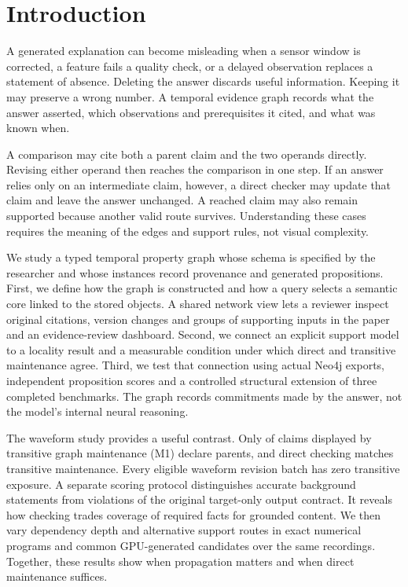 \section{Introduction}

A generated explanation can become misleading when a sensor window is corrected,
a feature fails a quality check, or a delayed observation replaces a statement
of absence. Deleting the answer discards useful information. Keeping it may
preserve a wrong number. A temporal evidence graph records what the answer
asserted, which observations and prerequisites it cited, and what was known when.

A comparison may cite both a parent claim and the two operands directly.
Revising either operand then reaches the comparison in one step.
If an answer relies only on an intermediate claim, however, a direct checker
may update that claim and leave the answer unchanged. A reached claim may also
remain supported because another valid route survives. Understanding these
cases requires the meaning of the edges and support rules, not visual complexity.

We study a typed temporal property graph whose schema is specified by the
researcher and whose instances record provenance and generated propositions.
First, we define how the graph is constructed
and how a query selects a semantic core linked to the stored objects.
A shared network view lets a reviewer inspect original citations, version changes
and groups of supporting inputs in the paper and an evidence-review dashboard.
Second, we connect an explicit support model to a locality result and a measurable
condition under which direct and transitive maintenance agree. Third, we test
that connection using actual Neo4j exports, independent proposition scores and
a controlled structural extension of three completed benchmarks. The graph
records commitments made by the answer, not the model's internal neural reasoning.

The waveform study provides a useful contrast. Only \SemParentClaims{}
of \SemDisplayedClaims{} claims displayed by transitive graph maintenance (M1)
declare parents, and direct checking
matches transitive maintenance. Every eligible waveform revision batch has zero
transitive exposure. A separate scoring protocol distinguishes accurate background
statements from violations of the original target-only output contract. It reveals
how checking trades coverage of required facts for grounded content. We then vary
dependency depth and alternative support routes in exact numerical programs and
common GPU-generated candidates over the same recordings. Together, these results
show when propagation matters and when direct maintenance suffices.

